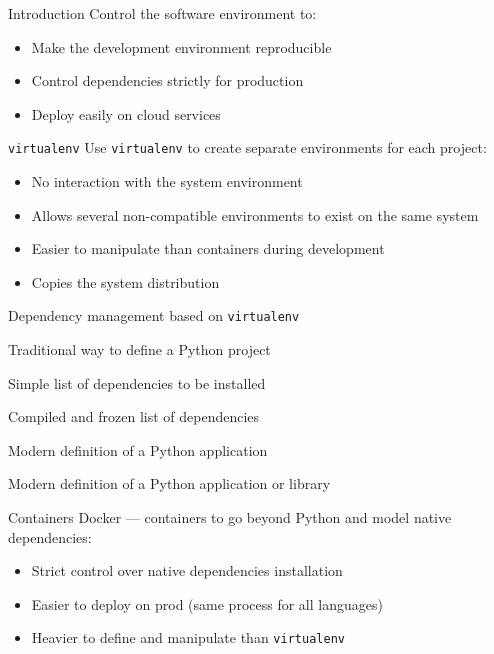 \begin{frame}{Introduction}
  Control the software environment to:
  \begin{itemize}[<+->]
    \item Make the development environment reproducible
    \item Control dependencies strictly for production
    \item Deploy easily on cloud services
  \end{itemize}
\end{frame}

\begin{frame}{\texttt{virtualenv}}
  Use \texttt{virtualenv} to create separate environments for each project:
  \begin{itemize}[<+->]
    \item No interaction with the system environment
    \item Allows several non-compatible environments to exist on the same system
    \item Easier to manipulate than containers during development
    \item Copies the system distribution
  \end{itemize}
\end{frame}

\begin{frame}{Dependency management based on \texttt{virtualenv}}
  \begin{description}[<+->]
    \item[pip + setup.py] Traditional way to define a Python project
    \item[pip + requirements.txt] Simple list of dependencies to be installed
    \item[pip + pip-compile] Compiled and frozen list of dependencies
    \item[Pipenv] Modern definition of a Python application
    \item[poetry] Modern definition of a Python application or library
  \end{description}
\end{frame}

\begin{frame}{Containers}
  Docker --- containers to go beyond Python and model native dependencies:
  \begin{itemize}[<+->]
    \item Strict control over native dependencies installation
    \item Easier to deploy on prod (same process for all languages)
    \item Heavier to define and manipulate than \texttt{virtualenv}
  \end{itemize}
\end{frame}
